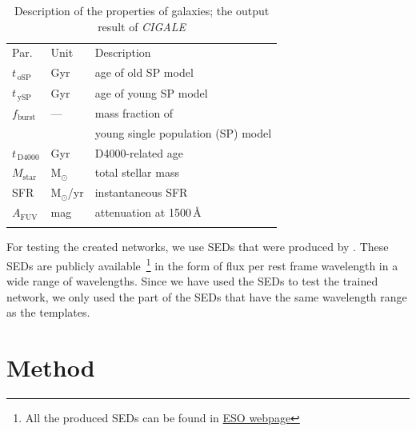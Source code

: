        
\begin{table}
\caption{Description of the properties of  galaxies; the output result of {\em CIGALE}}     
\label{tab: props}
\centering
\begin{tabular}{l l l}
\hline\hline
\noalign{\smallskip}
Par. & Unit & Description\\
\noalign{\smallskip}
\hline
\noalign{\smallskip}
$t_{\,\mathrm{oSP}}$ & Gyr & age of old SP model \\
$t_{\,\mathrm{ySP}}$ & Gyr & age of young SP model \\
$f_\mathrm{burst}$ & --- & mass fraction of \\
& & young single population (SP) model \\
\noalign{\smallskip}
$t_{\,\mathrm{D4000}}$ & Gyr & D4000-related age \\
\noalign{\smallskip}
$M_\mathrm{star}$ & M$_\odot$ & total stellar mass  \\
SFR & M$_\odot$/yr & instantaneous SFR  \\
$A_\mathrm{FUV}$ & mag & attenuation at 1500\,\AA{} \\
\noalign{\smallskip}
\hline
\end{tabular}
\end{table}

    For testing the created networks, we use SEDs that were produced by . 
    These SEDs are publicly available~\footnote{All the  produced SEDs can be found in \href{http://telbib.eso.org/detail.php?bibcode=2012AJ....144..172T}{ESO webpage}} in the form of flux per rest frame wavelength in a wide range of wavelengths.
    Since we have used the  SEDs to test the trained network, we only used the part of the SEDs that have the same wavelength range as the  templates.  



\section{Method}
\label{sec: method}
